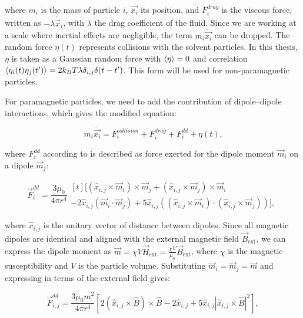 where $m_i$ is the mass of particle $i$, $\vec{x_i}$ its position, and $F^{drag}_i$ is the viscous force, written as $-\lambda \dot{\vec{x}}_i$, with $\lambda$ the drag coefficient of the fluid. Since we are working at a scale where inertial effects are negligible, the term $m_i\ddot{\vec{x_i}}$ can be dropped. The random force $\eta(t)$ represents collisions with the solvent particles. In this thesis, $\eta$ is taken as a Gaussian random force with $\expval{\eta} = 0$ and correlation $\expval{\eta_i(t)\eta_j(t')} = 2k_B T \lambda \delta_{i,j}\delta(t-t')$. This form will be used for non-paramagnetic particles.

For paramagnetic particles, we need to add the contribution of dipole–dipole interactions, which gives the modified equation:

\begin{equation}
  m_i\ddot{\vec{x_i}} = F^{collision}_i + F^{drag}_i + F^{dd}_i + \eta(t)\text{,}
  \label{eq:langevindipole}
\end{equation}

where $F^{dd}_i$ according to \cite{yung1998analytic} is described as force exerted for the dipole moment $\vec{m}_i$ on a dipole $\vec{m}_j$:

\begin{equation}
  \label{eq:dipoledipoleforce}
\vec{F}^{dd}_i = \frac{3\mu_0}{4\pi r^4}
\begin{multlined}[t]
\bigl[ (\hat{x}_{i,j} \times \vec{m}_i) \times \vec{m}_j
    + (\hat{x}_{i,j} \times \vec{m}_j) \times \vec{m}_i \\
    - 2\hat{x}_{i,j}(\vec{m}_i \cdot \vec{m}_j)
    + 5\hat{x}_{i,j}((\hat{x}_{i,j} \times \vec{m}_i) \cdot (\hat{x}_{i,j} \times \vec{m}_j)) \bigr],
\end{multlined}
\end{equation}

where $\hat{x}_{i,j}$ is the unitary vector of distance between dipoles. Since all magnetic dipoles are identical and aligned with the external magnetic field $\vec{B}_{\text{ext}}$, we can express the dipole moment as $\vec{m} = \chi V \vec{H}_{\text{ext}} = \frac{\chi V}{\mu_0} \vec{B}_{\text{ext}}$, where $\chi$ is the magnetic susceptibility and $V$ is the particle volume. Substituting $\vec{m}_i = \vec{m}_j = \vec{m}$ and expressing in terms of the external field gives:

\begin{equation}
  \label{eq:dipoledipoleforce_Bext}
  \vec{F}^{dd}_{i,j} = \frac{3\mu_0 m^2}{4\pi r^4}
\left[ 2(\hat{x}_{i,j} \times \hat{B}) \times \hat{B} - 2\hat{x}_{i,j} + 5\hat{x}_{i,j}|\hat{x}_{i,j} \times \hat{B}|^2 \right],
\end{equation}


